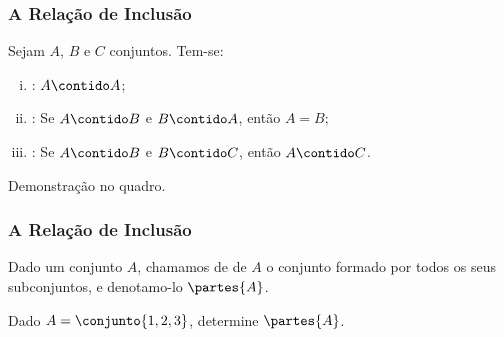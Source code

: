 \begin{frame}
	\frametitle{A Relação de Inclusão} 

	\begin{proposicao}
		Sejam $A$, $B$ e $C$ conjuntos. Tem-se:
		\begin{enumerate}[i.]
			\item {}: $A \contido A$;
			\item {}: Se $A \contido B$ e $B \contido A$, então $A = B$;
			\item {}: Se $A \contido B$ e $B \contido C$, então $A \contido C$.
		\end{enumerate}
	\end{proposicao}

	Demonstração no quadro.
\end{frame}


\begin{frame}
	\frametitle{A Relação de Inclusão} 

	\begin{definicao}
		Dado um conjunto $A$, chamamos de  de $A$ o conjunto formado por todos os seus subconjuntos, e denotamo-lo $\partes{A}$.
	\end{definicao}

	\begin{exemplo}
		Dado $A = \conjunto {1, 2, 3}$, determine $\partes{A}$.
	\end{exemplo}
\end{frame}